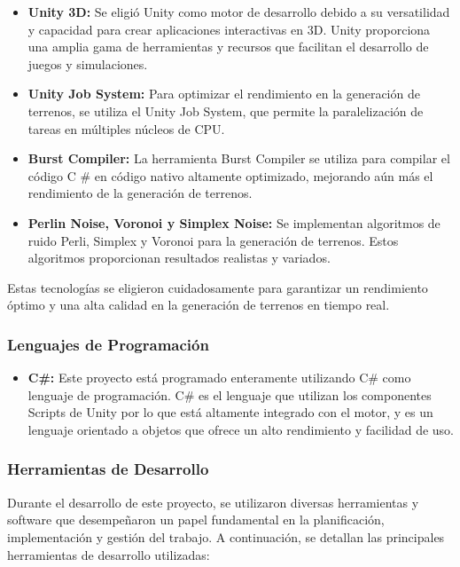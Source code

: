 \begin{itemize}
    \item \textbf{Unity 3D:} Se eligió Unity como motor de desarrollo debido a su versatilidad y capacidad para crear aplicaciones interactivas en 3D. Unity proporciona una amplia gama de herramientas y recursos que facilitan el desarrollo de juegos y simulaciones.
    
    \item \textbf{Unity Job System:} Para optimizar el rendimiento en la generación de terrenos, se utiliza el Unity Job System, que permite la paralelización de tareas en múltiples núcleos de CPU.
    
    \item \textbf{Burst Compiler:} La herramienta Burst Compiler se utiliza para compilar el código C \# en código nativo altamente optimizado, mejorando aún más el rendimiento de la generación de terrenos.
    
    \item \textbf{Perlin Noise, Voronoi y Simplex Noise:} Se implementan algoritmos de ruido Perli, Simplex y Voronoi para la generación de terrenos. Estos algoritmos proporcionan resultados realistas y variados.
    
\end{itemize}

Estas tecnologías se eligieron cuidadosamente para garantizar un rendimiento óptimo y una alta calidad en la generación de terrenos en tiempo real.

\subsubsection{Lenguajes de Programación}
\begin{itemize}
    \item \textbf{C\#:} Este proyecto está programado enteramente utilizando C\# como lenguaje de programación. C\# es el lenguaje que utilizan los componentes Scripts de Unity por lo que está altamente integrado con el motor, y es un lenguaje orientado a objetos que ofrece un alto rendimiento y facilidad de uso.
    
\end{itemize}

\subsubsection{Herramientas de Desarrollo}

Durante el desarrollo de este proyecto, se utilizaron diversas herramientas y software que desempeñaron un papel fundamental en la planificación, implementación y gestión del trabajo. A continuación, se detallan las principales herramientas de desarrollo utilizadas:

